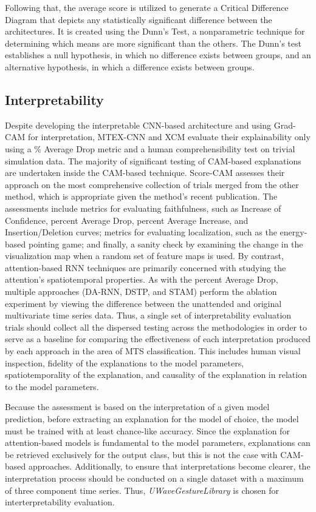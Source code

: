 \documentclass{svproc}
\begin{document}
Following that, the average score is utilized to generate a Critical Difference Diagram that depicts any statistically significant difference between the architectures. It is created using the Dunn's Test, a nonparametric technique for determining which means are more significant than the others. The Dunn's test establishes a null hypothesis, in which no difference exists between groups, and an alternative hypothesis, in which a difference exists between groups.

\subsection{Interpretability}

Despite developing the interpretable CNN-based architecture and using Grad-CAM for interpretation, MTEX-CNN and XCM evaluate their explainability only using a \% Average Drop metric and a human comprehensibility test on trivial simulation data. The majority of significant testing of CAM-based explanations are undertaken inside the CAM-based technique. Score-CAM \cite{wang2020score} assesses their approach on the most comprehensive collection of trials merged from the other method, which is appropriate given the method's recent publication. The assessments include metrics for evaluating faithfulness, such as Increase of Confidence, percent Average Drop, percent Average Increase, and Insertion/Deletion curves; metrics for evaluating localization, such as the energy-based pointing game; and finally, a sanity check by examining the change in the visualization map when a random set of feature maps is used. By contrast, attention-based RNN techniques are primarily concerned with studying the attention's spatiotemporal properties. As with the percent Average Drop, multiple approaches (DA-RNN, DSTP, and STAM) perform the ablation experiment by viewing the difference between the unattended and original multivariate time series data. Thus, a single set of interpretability evaluation trials should collect all the dispersed testing across the methodologies in order to serve as a baseline for comparing the effectiveness of each interpretation produced by each approach in the area of MTS classification. This includes human visual inspection, fidelity of the explanations to the model parameters, spatiotemporality of the explanation, and causality of the explanation in relation to the model parameters. 

Because the assessment is based on the interpretation of a given model prediction, before extracting an explanation for the model of choice, the model must be trained with at least chance-like accuracy. Since the explanation for attention-based models is fundamental to the model parameters, explanations can be retrieved exclusively for the output class, but this is not the case with CAM-based approaches. Additionally, to ensure that interpretations become clearer, the interpretation process should be conducted on a single dataset with a maximum of three component time series. Thus, \textit{UWaveGestureLibrary} is chosen for interterpretability evaluation.
\end{document}
